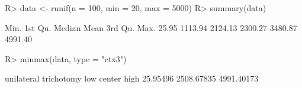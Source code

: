 \begin{Schunk}
% --begin: "minmax"
\begin{Sinput}
R> data <- runif(n = 100, min = 20, max = 5000)
R> summary(data)
\end{Sinput}
\begin{Soutput}
   Min. 1st Qu.  Median    Mean 3rd Qu.    Max. 
  25.95 1113.94 2124.13 2300.27 3480.87 4991.40 
\end{Soutput}
\begin{Sinput}
R> minmax(data, type = "ctx3")
\end{Sinput}
\begin{Soutput}
unilateral trichotomy
       low     center       high 
  25.95496 2508.67835 4991.40173 
\end{Soutput}
% --end: "minmax"
\end{Schunk}
